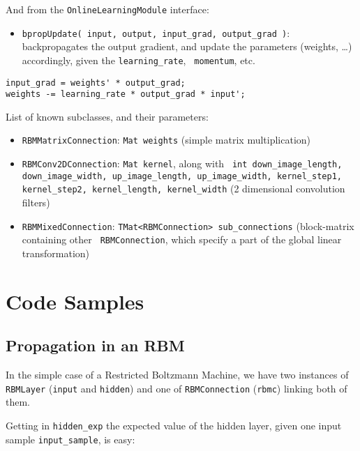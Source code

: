 \documentclass[11pt]{book}
\begin{document}
And from the {\tt OnlineLearningModule} interface:
\begin{itemize}

    \item {\tt bpropUpdate( input, output, input\_grad, output\_grad
    )}: backpropagates the output gradient, and update the parameters
    (weights, \ldots) accordingly, given the {\tt learning\_rate}, {\tt
    momentum}, etc.

\end{itemize}

\begin{verbatim}
input_grad = weights' * output_grad;
weights -= learning_rate * output_grad * input';
\end{verbatim}

List of known subclasses, and their parameters:
\begin{itemize}

    \item {\tt RBMMatrixConnection}: {\tt Mat weights} (simple matrix
    multiplication)

    \item {\tt RBMConv2DConnection}: {\tt Mat kernel}, along with {\tt
    int down\_image\_length, down\_image\_width, up\_image\_length,
    up\_image\_width, kernel\_step1, kernel\_step2, kernel\_length,
    kernel\_width} (2 dimensional convolution filters)

    \item {\tt RBMMixedConnection}: {\tt TMat<RBMConnection>
    sub\_connections} (block-matrix containing other {\tt
    RBMConnection}, which specify a part of the global linear
    transformation)

\end{itemize}

\section{Code Samples}

\subsection{Propagation in an RBM}

In the simple case of a Restricted Boltzmann Machine, we have two
instances of {\tt RBMLayer} ({\tt input} and {\tt hidden}) and one of
{\tt RBMConnection} ({\tt rbmc}) linking both of them.

Getting in {\tt hidden\_exp} the expected value of the hidden layer,
given one input sample {\tt input\_sample}, is easy:
\end{document}

